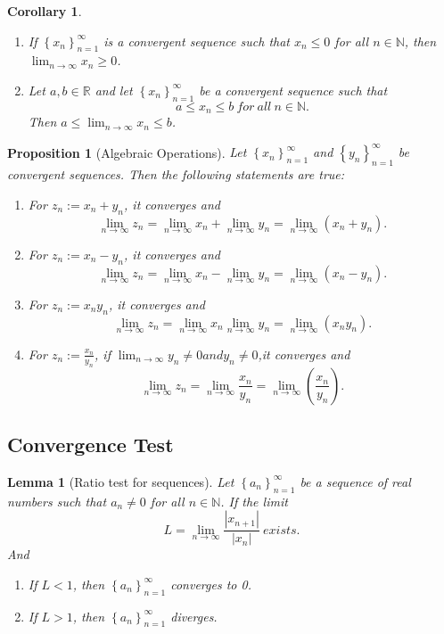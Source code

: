 \documentclass{article}
\newtheorem{lemma}[theorem]{Lemma}
\newtheorem{corollary}[theorem]{Corollary}
\newtheorem{prop}[theorem]{Proposition}
\theoremstyle{definition}
\begin{document}
\begin{corollary}
    \begin{enumerate}
        \item If $\left\{x_{n}\right\}_{n=1}^{\infty}$ is a convergent sequence such that $x_{n}\leq 0$ for all $n\in \mathbb{N}$, then $\lim_{n\to\infty}x_{n}\geq0$.
        \item Let $a,b\in\mathbb{R}$ and let $\left\{x_{n}\right\}_{n=1}^{\infty}$ be a convergent sequence such that 
        $$a\leq x_{n}\leq b\ for\ all\ n\in \mathbb{N}.$$
        Then $a\leq \lim_{n\rightarrow\infty}x_{n}\leq b$.
    \end{enumerate}
\end{corollary}

\begin{prop}[Algebraic Operations]

    Let $\left\{x_{n}\right\}_{n=1}^{\infty}$ and $\left\{y_{n}\right\}_{n=1}^{\infty}$ be convergent sequences. Then the following statements are true:
\begin{enumerate}
    \item For $z_{n}:=x_{n}+y_{n}$, it converges and $$\lim_{n\rightarrow \infty}z_{n}=\lim_{n\rightarrow \infty}x_{n}+\lim_{n\rightarrow \infty}y_{n}=\lim_{n\rightarrow \infty}(x_{n}+y_{n}).$$
    \item For $z_{n}:=x_{n}-y_{n}$, it converges and $$\lim_{n\rightarrow \infty}z_{n}=\lim_{n\rightarrow \infty}x_{n}-\lim_{n\rightarrow \infty}y_{n}=\lim_{n\rightarrow \infty}(x_{n}-y_{n}).$$
    \item For $z_{n}:=x_{n}y_{n}$, it converges and $$\lim_{n\rightarrow \infty}z_{n}=\lim_{n\rightarrow \infty}x_{n}\lim_{n\rightarrow \infty}y_{n}=\lim_{n\rightarrow \infty}(x_{n}y_{n}).$$
    \item For $z_{n}:=\frac{x_{n}}{y_{n}}$, if $\lim_{n\to \infty} y_{n}\neq 0 and y_{n}\neq 0$,it converges and $$\lim_{n\rightarrow \infty}z_{n}=\lim_{n\rightarrow \infty}\frac{x_{n}}{y_{n}}=\lim_{n\rightarrow \infty}\left(\frac{x_{n}}{y_{n}}\right).$$
\end{enumerate}
\end{prop}


\subsection{Convergence Test}
\begin{lemma}[Ratio test for sequences]
    Let $\left\{a_{n}\right\}_{n=1}^{\infty}$ be a sequence of real numbers such that $a_{n}\neq 0$ for all $n\in \mathbb{N}$. If the limit 
    $$L=\lim_{n\to \infty}\frac{|x_{n+1}|}{|x_{n}|}\ exists.$$
    And 
    \begin{enumerate}
        \item If $L<1$, then $\left\{a_{n}\right\}_{n=1}^{\infty}$ converges to 0.
        \item If $L>1$, then $\left\{a_{n}\right\}_{n=1}^{\infty}$ diverges.
    \end{enumerate}
\end{lemma}
\end{document}

